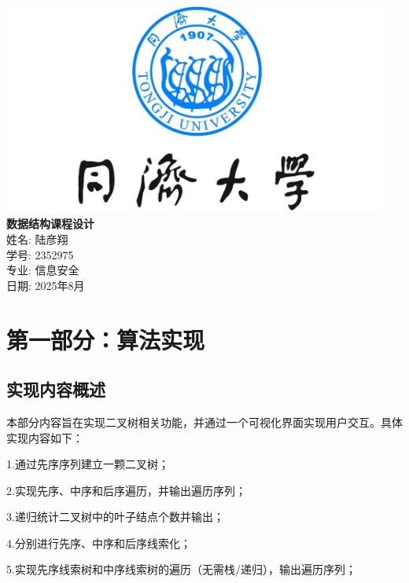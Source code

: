 \documentclass[12pt,a4paper]{article}
\begin{document}
\begin{titlepage}
    \centering
    \vspace*{0.5cm}
    
    \includegraphics[width=0.95\textwidth]{logo1.png}\\[3cm] %
    
    {\fontsize{30}{32}\selectfont\bfseries 数据结构课程设计}\\[2cm]
    {\large 姓名: 陆彦翔}\\[1cm]
    {\large 学号: 2352975}\\[1cm]
    {\large 专业: 信息安全}\\[1cm]
    
    {\large 日期: 2025年8月}\\[1cm] %
\end{titlepage}

\newpage
\tableofcontents


\newpage
\section{第一部分：算法实现}
\subsection{实现内容概述}
本部分内容旨在实现二叉树相关功能，并通过一个可视化界面实现用户交互。具体实现内容如下：

1.通过先序序列建立一颗二叉树；

2.实现先序、中序和后序遍历，并输出遍历序列；

3.递归统计二叉树中的叶子结点个数并输出；

4.分别进行先序、中序和后序线索化；

5.实现先序线索树和中序线索树的遍历（无需栈/递归），输出遍历序列；
\end{document}
